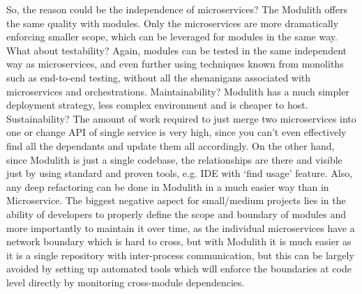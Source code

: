 So, the reason could be the independence of microservices? The Modulith offers the same quality with modules. Only the microservices are more dramatically enforcing smaller scope, which can be leveraged for modules in the same way. What about testability? Again, modules can be tested in the same independent way as microservices, and even further using techniques known from monoliths such as end-to-end testing, without all the shenanigans associated with microservices and orchestrations. Maintainability? Modulith has a much simpler deployment strategy, less complex environment and is cheaper to host. Sustainability? The amount of work required to just merge two microservices into one or change API of single service is very high, since you can't even effectively find all the dependants and update them all accordingly. On the other hand, since Modulith is just a single codebase, the relationships are there and visible just by using standard and proven tools, e.g. IDE with `find usage' feature. Also, any deep refactoring can be done in Modulith in a much easier way than in Microservice. The biggest negative aspect for small/medium projects lies in the ability of developers to properly define the scope and boundary of modules and more importantly to maintain it over time, as the individual microservices have a network boundary which is hard to cross, but with Modulith it is much easier as it is a single repository with inter-process communication, but this can be largely avoided by setting up automated tools which will enforce the boundaries at code level directly by monitoring cross-module dependencies.


